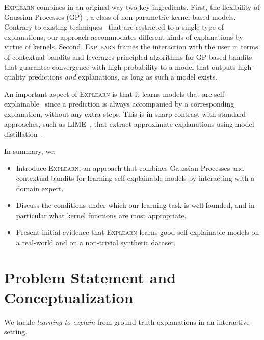 \documentclass[letterpaper]{article} %
\newcommand{\explearn}{\textsc{Explearn}\xspace}
\begin{document}
\explearn combines in an original way two key ingredients.
%
First, the flexibility of Gaussian Processes (GP)~\cite{rasmussen2006gaussian}, a class of non-parametric kernel-based models.  Contrary to existing techniques~\cite{teso2019explanatory,schramowski2020right,lertvittayakumjorn2020find} that are restricted to a single type of explanations, our approach accommodates different kinds of explanations by virtue of kernels.
Second, \explearn frames the interaction with the user in terms of contextual bandits and leverages principled algorithms for GP-based bandits~\cite{krause2011contextual} that guarantee convergence with high probability to a model that outputs high-quality predictions \emph{and} explanations, as long as such a model exists.

An important aspect of \explearn is that
it learns models that are self-explainable~\cite{alvarez2018towards} since a prediction is always accompanied by a corresponding explanation, without any extra steps. This is in sharp contrast with standard approaches, such as LIME~\cite{ribeiro2016should}, that extract approximate explanations using model distillation~\cite{bucilua2006model}.


In summary, we:
%
\begin{itemize}

    \item Introduce \explearn, an approach that combines Gaussian Processes and contextual bandits for learning self-explainable models by interacting with a domain expert.
    
    \item Discuss the conditions under which our learning task is well-founded, and in particular what kernel functions are most appropriate.
    
    \item Present initial evidence that \explearn learns good self-explainable models on a real-world and on a non-trivial synthetic dataset.

\end{itemize}



\section{Problem Statement and Conceptualization}
\label{sec:preliminaries}

We tackle \emph{learning to explain} from ground-truth explanations in an interactive setting.  %
\end{document}
